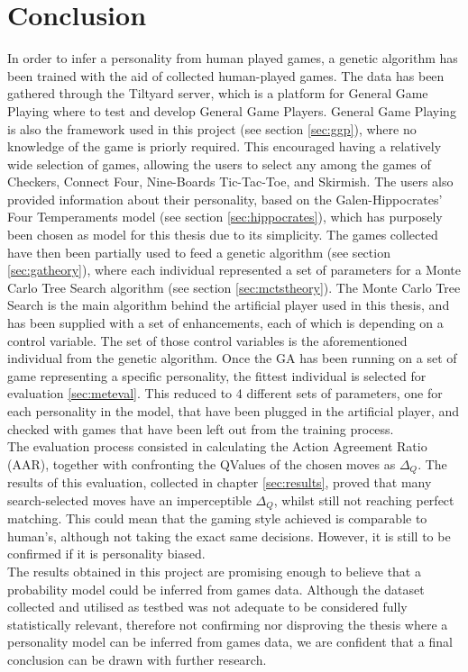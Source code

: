 \chapter{Conclusion}
In order to infer a personality from human played games, a genetic algorithm has been trained with the aid of collected human-played games. The data has been gathered through the Tiltyard server\cite{tiltyard}, which is a platform for General Game Playing where to test and develop General Game Players. General Game Playing is also the framework used in this project (see section \ref{sec:ggp}), where no knowledge of the game is priorly required. This encouraged having a relatively wide selection of games, allowing the users to select any among the games of Checkers, Connect Four, Nine-Boards Tic-Tac-Toe, and Skirmish. The users also provided information about their personality, based on the Galen-Hippocrates' Four Temperaments model (see section \ref{sec:hippocrates}), which has purposely been chosen as model for this thesis due to its simplicity. The games collected have then been partially used to feed a genetic algorithm (see section \ref{sec:gatheory}), where each individual represented a set of parameters for a Monte Carlo Tree Search algorithm (see section \ref{sec:mctstheory}). The Monte Carlo Tree Search is the main algorithm behind the artificial player used in this thesis, and has been supplied with a set of enhancements, each of which is depending on a control variable. The set of those control variables is the aforementioned individual from the genetic algorithm. Once the GA has been running on a set of game representing a specific personality, the fittest individual is selected for evaluation \ref{sec:meteval}. This reduced to 4 different sets of parameters, one for each personality in the model, that have been plugged in the artificial player, and checked with games that have been left out from the training process.\\
The evaluation process consisted in calculating the Action Agreement Ratio (AAR), together with confronting the QValues of the chosen moves as $\Delta_Q$. The results of this evaluation, collected in chapter \ref{sec:results}, proved that many search-selected moves have an imperceptible $\Delta_Q$, whilst still not reaching perfect matching. This could mean that the gaming style achieved is comparable to human's, although not taking the exact same decisions. However, it is still to be confirmed if it is personality biased.\\
The results obtained in this project are promising enough to believe that a probability model could be inferred from games data. Although the dataset collected and utilised as testbed was not adequate to be considered fully statistically relevant, therefore not confirming nor disproving the thesis where a personality model can be inferred from games data, we are confident that a final conclusion can be drawn with further research.\\
